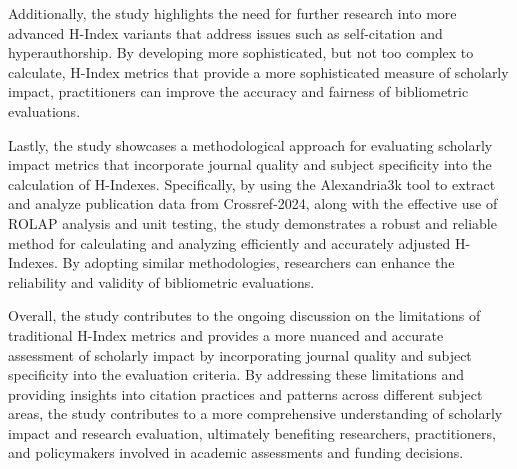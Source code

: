 Additionally, the study highlights the need for further research into more
advanced H-Index variants that address issues such as self-citation and
hyperauthorship. By developing more sophisticated, but not too complex to
calculate, H-Index metrics that provide a more sophisticated measure of
scholarly impact, practitioners can improve the accuracy and fairness of
bibliometric evaluations.

Lastly, the study showcases a methodological approach for evaluating scholarly
impact metrics that incorporate journal quality and subject specificity into
the calculation of H-Indexes. Specifically, by using the Alexandria3k tool to
extract and analyze publication data from Crossref-2024, along with the
effective use of ROLAP analysis and unit testing, the study demonstrates a
robust and reliable method for calculating and analyzing efficiently and
accurately adjusted H-Indexes. By adopting similar methodologies, researchers
can enhance the reliability and validity of bibliometric evaluations.

Overall, the study contributes to the ongoing discussion on the limitations of
traditional H-Index metrics and provides a more nuanced and accurate assessment
of scholarly impact by incorporating journal quality and subject specificity
into the evaluation criteria. By addressing these limitations and providing
insights into citation practices and patterns across different subject areas,
the study contributes to a more comprehensive understanding of scholarly impact
and research evaluation, ultimately benefiting researchers, practitioners, and
policymakers involved in academic assessments and funding decisions. %
